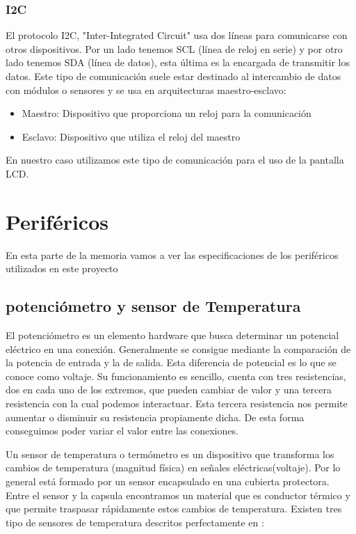 \subsubsection{I2C}
El protocolo I2C, "Inter-Integrated Circuit" usa dos líneas para comunicarse con otros dispositivos. Por un lado tenemos SCL (línea de reloj en serie) y por otro lado tenemos SDA (línea de datos), esta última es la encargada de transmitir los datos. Este tipo de comunicación suele estar destinado al intercambio de datos con módulos o sensores y se usa en arquitecturas maestro-esclavo:
\begin{itemize}
\item Maestro: Dispositivo que proporciona un reloj para la comunicación
\item Esclavo: Dispositivo que utiliza el reloj del maestro
\end{itemize}
En nuestro caso utilizamos este tipo de comunicación para el uso de la pantalla LCD.

\section{Periféricos}\label{sec:perifericos}
En esta parte de la memoria vamos a ver las especificaciones de los periféricos utilizados en este proyecto

\subsection{potenciómetro y sensor de Temperatura}

El potenciómetro es un elemento hardware que busca determinar un potencial eléctrico en una conexión. Generalmente se consigue mediante la comparación de la potencia de entrada y la de salida. Esta diferencia de potencial es lo que se conoce como voltaje.
Su funcionamiento es sencillo, cuenta con tres resistencias, dos en cada uno de los extremos, que pueden cambiar de valor y una tercera resistencia con la cual podemos interactuar. Esta tercera resistencia nos permite aumentar o disminuir su resistencia propiamente dicha. De esta forma conseguimos poder variar el valor entre las conexiones.

Un sensor de temperatura o termómetro es un dispositivo que transforma los cambios de temperatura (magnitud física) en señales eléctricas(voltaje). Por lo general está  formado por un sensor encapsulado en una cubierta protectora. Entre el sensor y la capsula encontramos un material que es  conductor térmico y que permite traspasar rápidamente estos cambios de temperatura. Existen tres tipo de sensores de temperatura descritos perfectamente en \cite{TempSensTipos}:

